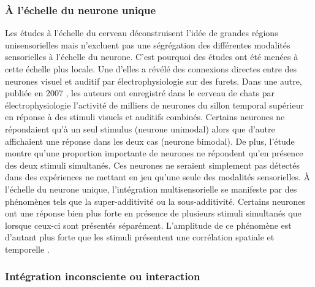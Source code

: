 
\subsubsection{À l'échelle du neurone unique}

Les études à l'échelle du cerveau déconstruisent l'idée de grandes régions unisensorielles mais n'excluent pas une ségrégation des différentes modalités sensorielles à l'échelle du neurone. C'est pourquoi des études ont été menées à cette échelle plus locale. Une d'elles a révélé des connexions directes entre des neurones visuel et auditif \cite{bizley_physiological_2007} par électrophysiologie sur des furets. Dans une autre, publiée en 2007 \cite{allman_multisensory_2007}, les auteurs ont enregistré dans le cerveau de chats par électrophysiologie l'activité de milliers de neurones du sillon temporal supérieur en réponse à des stimuli visuels et auditifs combinés. Certains neurones ne répondaient qu'à un seul stimulus (neurone unimodal) alors que d'autre affichaient une réponse dans les deux cas (neurone bimodal). De plus, l'étude montre qu'une proportion importante de neurones ne répondent qu'en présence des deux stimuli simultanés. Ces neurones ne seraient simplement pas détectés dans des expériences ne mettant en jeu qu'une seule des modalités sensorielles. À l'échelle du neurone unique, l'intégration multisensorielle se manifeste par des phénomènes tels que la super-additivité ou la sous-additivité. Certains neurones ont une réponse bien plus forte en présence de plusieurs stimuli simultanés que lorsque ceux-ci sont présentés séparément. L'amplitude de ce phénomène est d'autant plus forte que les stimuli présentent une corrélation spatiale et temporelle \cite{stein_multisensory_2008}. 


\subsubsection{Intégration inconsciente ou interaction}\label{integration_interaction}

